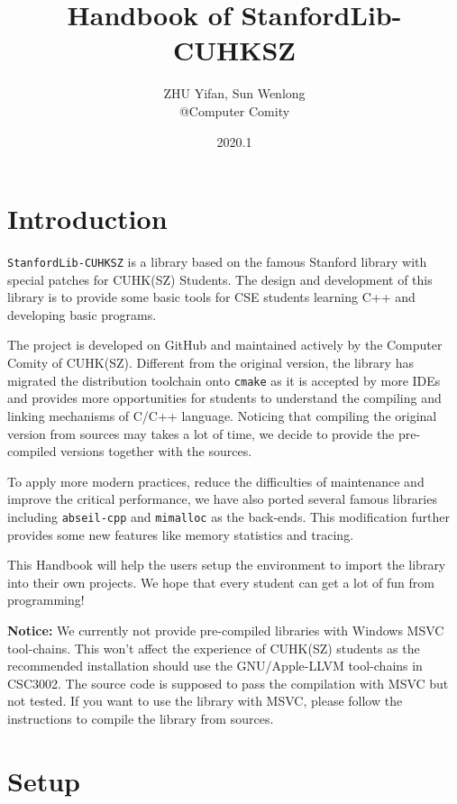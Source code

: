 \documentclass[a4paper,12pt]{report}
\begin{document}
\author{ZHU Yifan, Sun Wenlong\\@Computer Comity}
\title{Handbook of StanfordLib-CUHKSZ}
\date{2020.1}

\maketitle
\tableofcontents
\chapter{Introduction}

\texttt{StanfordLib-CUHKSZ} is a library based on the famous Stanford library with special patches for CUHK(SZ) Students. The design and development of this library is to provide some basic tools for CSE students learning C++ and developing basic programs.

The project is developed on GitHub and maintained actively by the Computer Comity of CUHK(SZ). Different from the original version, the library has migrated the distribution toolchain onto \texttt{cmake} as it is accepted by more IDEs and provides more opportunities for students to understand the compiling and linking mechanisms of C/C++ language. Noticing that compiling the original version from sources may takes a lot of time, we decide to provide the pre-compiled versions together with the sources. 

To apply more modern practices, reduce the difficulties of maintenance and improve the critical performance, we have also ported several famous libraries including \texttt{abseil-cpp} and \texttt{mimalloc} as the back-ends. This modification further provides some new features like memory statistics and tracing.

This Handbook will help the users setup the environment to import the library into their own projects. We hope that every student can get a lot of fun from programming!

\textbf{Notice: } We currently not provide pre-compiled libraries with Windows MSVC tool-chains. This won't affect the experience of CUHK(SZ) students as the recommended installation should use the GNU/Apple-LLVM tool-chains in CSC3002. The source code is supposed to pass the compilation with MSVC but not tested. If you want to use the library with MSVC, please follow the instructions to compile the library from sources.

\chapter{Setup}
\end{document}
